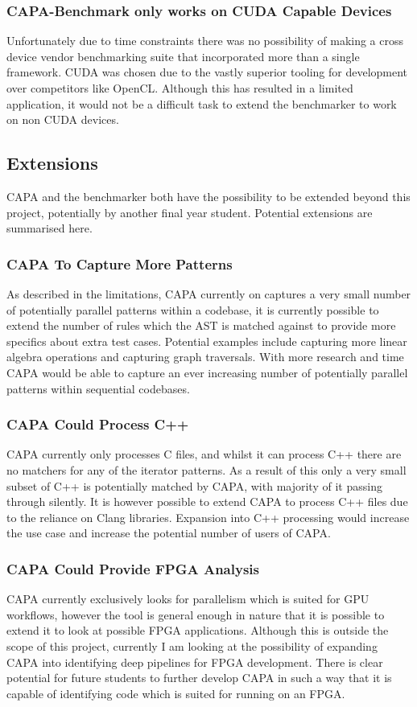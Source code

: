 \subsubsection{CAPA-Benchmark only works on CUDA Capable Devices}
Unfortunately due to time constraints there was no possibility of making a cross device vendor
benchmarking suite that incorporated more than a single framework. CUDA was chosen due to the vastly
superior tooling for development over competitors like OpenCL. Although this has resulted in a
limited application, it would not be a difficult task to extend the benchmarker to work on non CUDA
devices.


\pagebreak

\subsection{Extensions}
CAPA and the benchmarker both have the possibility to be extended beyond this project, potentially
by another final year student. Potential extensions are summarised here.

\subsubsection{CAPA To Capture More Patterns}
As described in the limitations, CAPA currently on captures a very small number of potentially
parallel patterns within a codebase, it is currently possible to extend the number of rules which
the AST is matched against to provide more specifics about extra test cases. Potential examples
include capturing more linear algebra operations and capturing graph traversals. With more research
and time CAPA would be able to capture an ever increasing number of potentially parallel patterns
within sequential codebases.

\subsubsection{CAPA Could Process C++}
CAPA currently only processes C files, and whilst it can process C++ there are no matchers for any
of the iterator patterns. As a result of this only a very small subset of C++ is potentially matched
by CAPA, with majority of it passing through silently. It is however possible to extend CAPA to
process C++ files due to the reliance on Clang libraries. Expansion into C++ processing would
increase the use case and increase the potential number of users of CAPA.

\subsubsection{CAPA Could Provide FPGA Analysis}
CAPA currently exclusively looks for parallelism which is suited for GPU workflows, however the tool
is general enough in nature that it is possible to extend it to look at possible FPGA applications.
Although this is outside the scope of this project, currently I am looking at the possibility of
expanding CAPA into identifying deep pipelines for FPGA development. There is clear potential for
future students to further develop CAPA in such a way that it is capable of identifying code which
is suited for running on an FPGA.


